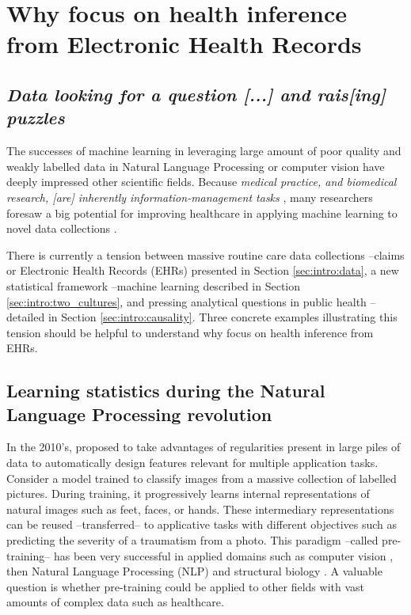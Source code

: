 \documentclass[french,12pt,twoside,a4paper]{book}
\begin{document}
\minitoc
\section{Why focus on health inference from Electronic Health Records}\label{sec:intro:landscape}


\subsection{\textit{Data looking for a question [...] and rais[ing] puzzles} \citep{cox2001statistical}}%
\label{subsec:intro:wrapup}%

The successes of machine learning in leveraging large amount of poor quality and
weakly labelled data in Natural Language Processing or computer vision have
deeply impressed other scientific fields. Because \textit{medical practice, and
  biomedical research, [are] inherently information-management tasks}
\citep{patel2009coming}, many researchers foresaw a big potential for improving
healthcare in applying machine learning to novel data collections
\citep{topol2019high,rajkomar2019machine}.

There is currently a tension between massive routine care data collections
--claims or Electronic Health Records (EHRs) presented in Section \ref{sec:intro:data}, a new statistical
framework --machine learning \citep{breiman2001statistical} described in Section
\ref{sec:intro:two_cultures}, and pressing analytical questions in public health
--detailed in Section \ref{sec:intro:causality}. Three concrete examples illustrating this tension should be helpful to
understand why focus on health inference from EHRs.

\subsection{Learning statistics during the Natural Language Processing revolution}

In the 2010's, \cite{halevy2009unreasonable} proposed to take advantages of
regularities present in large piles of data to automatically design features
relevant for multiple application tasks. Consider a model trained to classify
images from a massive collection of labelled pictures. During training, it
progressively learns internal representations of natural images such as feet,
faces, or hands. These intermediary representations can be reused
--transferred-- to applicative tasks with different objectives such as
predicting the severity of a traumatism from a photo. This paradigm --called
pre-training-- has been very successful in applied domains such as computer
vision \citep{krizhevsky2012imagenet}, then Natural Language Processing (NLP)
\citep{devlin2018bert} and structural biology \citep{jumper2021highly}. A
valuable question is whether pre-training could be applied to other fields with
vast amounts of complex data such as healthcare.
\end{document}
